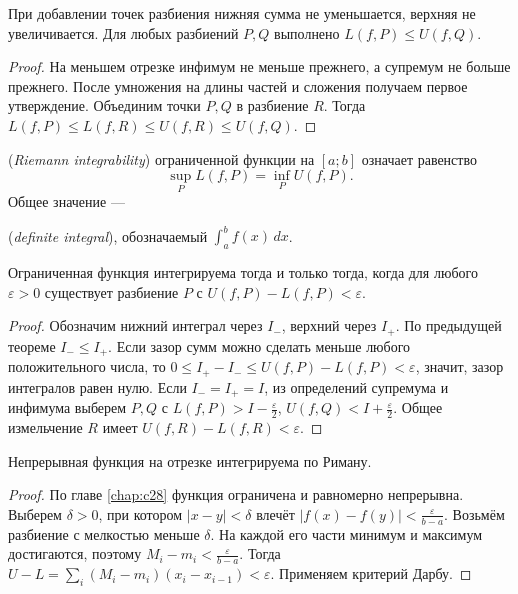 \begin{theorem}\label{thm:legacy-c29-1}
При добавлении точек разбиения нижняя сумма не уменьшается, верхняя не увеличивается. Для любых разбиений \(P,Q\) выполнено \(L(f,P)\le U(f,Q)\).
\end{theorem}
\begin{proof}
На меньшем отрезке инфимум не меньше прежнего, а супремум не больше прежнего. После умножения на длины частей и сложения получаем первое утверждение. Объединим точки \(P,Q\) в разбиение \(R\). Тогда \(L(f,P)\le L(f,R)\le U(f,R)\le U(f,Q)\).
\end{proof}
\begin{definition}
 (\emph{Riemann integrability}) ограниченной функции на \([a;b]\) означает равенство
\[
\sup_P L(f,P)=\inf_P U(f,P).
\]
Общее значение — \par {} (\emph{definite integral}), обозначаемый \(\displaystyle\int_a^b f(x)\,dx\).
\end{definition}
\begin{theorem}\label{thm:legacy-c29-2}
Ограниченная функция интегрируема тогда и только тогда, когда для любого \(\varepsilon>0\) существует разбиение \(P\) с \(U(f,P)-L(f,P)<\varepsilon\).
\end{theorem}
\begin{proof}
Обозначим нижний интеграл через \(I_-\), верхний через \(I_+\). По предыдущей теореме \(I_-\le I_+\). Если зазор сумм можно сделать меньше любого положительного числа, то \(0\le I_+-I_-\le U(f,P)-L(f,P)<\varepsilon\), значит, зазор интегралов равен нулю.
Если \(I_-=I_+=I\), из определений супремума и инфимума выберем \(P,Q\) с \(L(f,P)>I-\frac\varepsilon2\), \(U(f,Q)<I+\frac\varepsilon2\). Общее измельчение \(R\) имеет \(U(f,R)-L(f,R)<\varepsilon\).
\end{proof}
\begin{theorem}\label{thm:legacy-c29-3}
Непрерывная функция на отрезке интегрируема по Риману.
\end{theorem}
\begin{proof}
По главе \ref{chap:c28} функция ограничена и равномерно непрерывна. Выберем \(\delta>0\), при котором \(|x-y|<\delta\) влечёт \(|f(x)-f(y)|<\frac\varepsilon{b-a}\). Возьмём разбиение с мелкостью меньше \(\delta\). На каждой его части минимум и максимум достигаются, поэтому \(M_i-m_i<\frac\varepsilon{b-a}\). Тогда \(U-L=\sum_i(M_i-m_i)(x_i-x_{i-1})<\varepsilon\). Применяем критерий Дарбу.
\end{proof}
